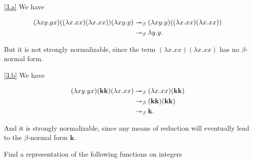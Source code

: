 \documentclass{homework}
\begin{document}
\begin{solution}

  \ref{3.a} We have

  \begin{align*}
    (\lambda xy.yx)((\lambda x.xx)(\lambda x.xx))(\lambda xy.y) &\twoheadrightarrow_{\beta} (\lambda xy.y)((\lambda x.xx)(\lambda x.xx)) \\
    &\twoheadrightarrow_{\beta} \lambda y.y.
  \end{align*}

  But it is not strongly normalizable, since the term $(\lambda x.xx)(\lambda x.xx)$ has no \(\beta\)-normal form.

  \ref{3.b} We have

  \begin{align*}
    (\lambda xy.yx)(\mathbf{k} \mathbf{k})(\lambda x.xx) &\twoheadrightarrow_{\beta} (\lambda x.xx)(\mathbf{k}\mathbf{k}) \\
    &\twoheadrightarrow_{\beta} (\mathbf{k}\mathbf{k})(\mathbf{k}\mathbf{k}) \\
    &\twoheadrightarrow_{\beta} \mathbf{k}.
  \end{align*}

  And it is strongly normalizable,
  since any means of reduction will eventually lead to the \(\beta\)-normal form $\mathbf{k}$.

\end{solution}

\begin{problem}
  Find a representation of the following functions on integers
\end{problem}
\end{document}
